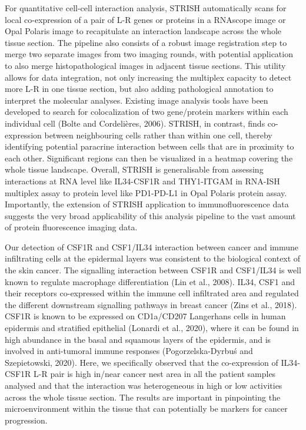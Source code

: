 For quantitative cell-cell interaction analysis, STRISH automatically scans for local co-expression of a pair of L-R genes or proteins in a RNAscope image or Opal Polaris image to recapitulate an interaction landscape across the whole tissue section. The pipeline also consists of a robust image registration step to merge two separate images from two imaging rounds, with potential application to also merge histopathological images in adjacent tissue sections. This utility allows for data integration, not only increasing the multiplex capacity to detect more L-R in one tissue section, but also adding pathological annotation to interpret the molecular analyses.  Existing image analysis tools have been developed to search for colocalization of two gene/protein markers within each individual cell (Bolte and Cordelières, 2006). STRISH, in contrast, finds co-expression between neighbouring cells rather than within one cell, thereby identifying potential paracrine interaction between cells that are in proximity to each other. Significant regions can then be visualized in a heatmap covering the whole tissue landscape. Overall, STRISH is generalisable from assessing interactions at RNA level like IL34-CSF1R and THY1-ITGAM in RNA-ISH multiplex assay to protein level like PD1-PD-L1 in Opal Polaris protein assay. Importantly, the extension of STRISH application to immunofluorescence data suggests the very broad applicability of this analysis pipeline to the vast amount of protein fluorescence imaging data. 

Our detection of CSF1R and CSF1/IL34 interaction between cancer and immune infiltrating cells at the epidermal layers was consistent to the biological context of the skin cancer. The signalling interaction between CSF1R and CSF1/IL34 is well known to regulate macrophage differentiation (Lin et al., 2008). IL34, CSF1 and their receptors co-expressed within the immune cell infiltrated area and regulated the different downstream signalling pathways in breast cancer (Zins et al., 2018). CSF1R is known to be expressed on CD1a/CD207 Langerhans cells in human epidermis and stratified epithelial (Lonardi et al., 2020), where it can be found in high abundance in the basal and squamous layers of the epidermis, and is involved in anti-tumoral immune responses (Pogorzelska-Dyrbuś and Szepietowski, 2020). Here, we specifically observed that the co-expression of IL34-CSF1R L-R pair is high in/near cancer nest area in all the patient samples analysed and that the interaction was heterogeneous in high or low activities across the whole tissue section. The results are important in pinpointing the microenvironment within the tissue that can potentially be markers for cancer progression.


